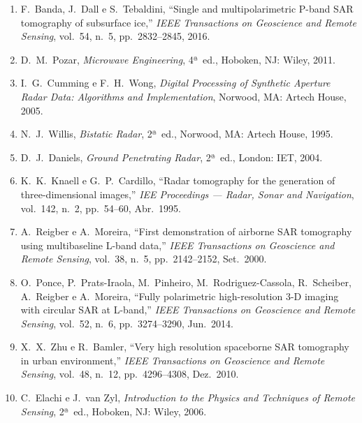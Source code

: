 \documentclass[12pt,a4paper,oneside]{book}
\theoremstyle{remark}
\theoremstyle{plain}
\theoremstyle{definition}
\begin{document}
\begin{enumerate}
  \item \label{ref:banda2016}
  F.\ Banda, J.\ Dall e S.\ Tebaldini,
  ``Single and multipolarimetric P-band SAR tomography of subsurface ice,''
  \textit{IEEE Transactions on Geoscience and Remote Sensing}, vol.\ 54, n.\ 5,
  pp.\ 2832--2845, 2016.

  \item \label{ref:pozar2011}
  D.\ M.\ Pozar, \textit{Microwave Engineering}, 4ª~ed.,
  Hoboken, NJ: Wiley, 2011.

  \item \label{ref:cumming2005}
  I.\ G.\ Cumming e F.\ H.\ Wong, \textit{Digital Processing of Synthetic
  Aperture Radar Data: Algorithms and Implementation},
  Norwood, MA: Artech House, 2005.

  \item \label{ref:willis1995}
  N.\ J.\ Willis, \textit{Bistatic Radar}, 2ª~ed.,
  Norwood, MA: Artech House, 1995.

  \item \label{ref:daniels2004}
  D.\ J.\ Daniels, \textit{Ground Penetrating Radar}, 2ª~ed.,
  London: IET, 2004.

  \item \label{ref:knaell1995}
  K.\ K.\ Knaell e G.\ P.\ Cardillo, ``Radar tomography for the generation of
  three-dimensional images,''
  \textit{IEE Proceedings — Radar, Sonar and Navigation}, vol.\ 142, n.\ 2,
  pp.\ 54--60, Abr.\ 1995.

  \item \label{ref:reigber2000}
  A.\ Reigber e A.\ Moreira, ``First demonstration of airborne SAR tomography
  using multibaseline L-band data,''
  \textit{IEEE Transactions on Geoscience and Remote Sensing}, vol.\ 38, n.\ 5,
  pp.\ 2142--2152, Set.\ 2000.

  \item \label{ref:ponce2014}
  O.\ Ponce, P.\ Prats-Iraola, M.\ Pinheiro, M.\ Rodriguez-Cassola,
  R.\ Scheiber, A.\ Reigber e A.\ Moreira,
  ``Fully polarimetric high-resolution 3-D imaging with circular SAR at L-band,''
  \textit{IEEE Transactions on Geoscience and Remote Sensing}, vol.\ 52, n.\ 6,
  pp.\ 3274--3290, Jun.\ 2014.

  \item \label{ref:zhu2010}
  X.\ X.\ Zhu e R.\ Bamler, ``Very high resolution spaceborne SAR tomography
  in urban environment,''
  \textit{IEEE Transactions on Geoscience and Remote Sensing}, vol.\ 48, n.\ 12,
  pp.\ 4296--4308, Dez.\ 2010.

  \item \label{ref:elachi2006}
  C.\ Elachi e J.\ van Zyl, \textit{Introduction to the Physics and Techniques
  of Remote Sensing}, 2ª~ed., Hoboken, NJ: Wiley, 2006.


\end{enumerate}
\end{document}
